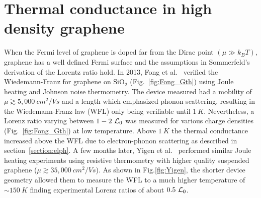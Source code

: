 \chapter{Thermal conductance in high density graphene}
\label{ch:thermal_conductance_in_high_density_graphene}
When the Fermi level of graphene is doped far from the Dirac point $(\mu\gg k_BT)$, graphene has a well defined Fermi surface and the assumptions in Sommerfeld's derivation of the Lorentz ratio hold. In 2013, Fong et al.~\cite{fong_measurement_2013} verified the Wiedemann-Franz for graphene on SiO$_2$ (Fig.~\ref{fig:Fong_Gth}) using Joule heating and Johnson noise thermometry. The device measured had a mobility of $\mu \gtrsim 5,000~cm^2/Vs$ and a length which emphasized phonon scattering, resulting in the Wiedemann-Franz law (WFL) only being verifiable until $1~K$. Nevertheless, a Lorenz ratio varying between $1-2~\mathcal{L}_0$ was measured for various charge densities (Fig.~\ref{fig:Fong_Gth}) at low temperature. Above $1~K$ the thermal conductance increased above the WFL due to electron-phonon scattering as described in section~\ref{section:elph}. A few months later, Yigen et al.~\cite{yigen_wiedemannfranz_2014} performed similar Joule heating experiments using resistive thermometry with higher quality suspended graphene ($\mu \gtrsim 35,000~cm^2/Vs$). As shown in Fig.\ref{fig:Yigen}, the shorter device geometry allowed them to measure the WFL to a much higher temperature of ${\sim}150~K$ finding experimental Lorenz ratios of about $0.5~\mathcal{L}_0$.
